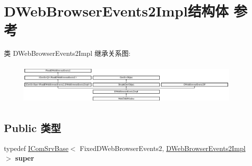 \hypertarget{struct_d_web_browser_events2_impl}{}\section{D\+Web\+Browser\+Events2\+Impl结构体 参考}
\label{struct_d_web_browser_events2_impl}
类 D\+Web\+Browser\+Events2\+Impl 继承关系图\+:\begin{figure}[H]
\begin{center}
\leavevmode
\includegraphics[height=2.150538cm]{struct_d_web_browser_events2_impl}
\end{center}
\end{figure}
\subsection*{Public 类型}
\begin{DoxyCompactItemize}
\item 
\mbox{\label{struct_d_web_browser_events2_impl_abc58ff4a9324dcdd9ddf7d978803542b}} 
typedef \hyperlink{class_i_com_srv_base}{I\+Com\+Srv\+Base}$<$ Fixed\+D\+Web\+Browser\+Events2, \hyperlink{struct_d_web_browser_events2_impl}{D\+Web\+Browser\+Events2\+Impl} $>$ {\bfseries super}
\end{DoxyCompactItemize}
